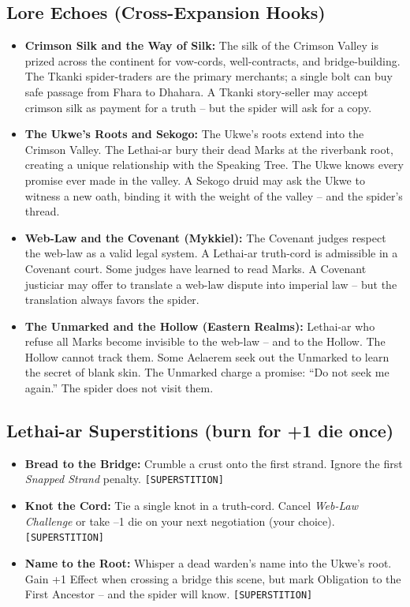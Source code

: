 \subsection*{Lore Echoes (Cross-Expansion Hooks)}
\label{sec:lethaiar-lore}

\begin{itemize}
  \item \textbf{Crimson Silk and the Way of Silk:} The silk of the Crimson Valley is prized across the continent for vow-cords, well-contracts, and bridge-building. The Tkanki spider-traders are the primary merchants; a single bolt can buy safe passage from Fhara to Dhahara. A Tkanki story-seller may accept crimson silk as payment for a truth -- but the spider will ask for a copy.
  \item \textbf{The Ukwe's Roots and Sekogo:} The Ukwe's roots extend into the Crimson Valley. The Lethai-ar bury their dead Marks at the riverbank root, creating a unique relationship with the Speaking Tree. The Ukwe knows every promise ever made in the valley. A Sekogo druid may ask the Ukwe to witness a new oath, binding it with the weight of the valley -- and the spider's thread.
  \item \textbf{Web-Law and the Covenant (Mykkiel):} The Covenant judges respect the web-law as a valid legal system. A Lethai-ar truth-cord is admissible in a Covenant court. Some judges have learned to read Marks. A Covenant justiciar may offer to translate a web-law dispute into imperial law -- but the translation always favors the spider.
  \item \textbf{The Unmarked and the Hollow (Eastern Realms):} Lethai-ar who refuse all Marks become invisible to the web-law -- and to the Hollow. The Hollow cannot track them. Some Aelaerem seek out the Unmarked to learn the secret of blank skin. The Unmarked charge a promise: ``Do not seek me again.'' The spider does not visit them.
\end{itemize}

\subsection*{Lethai-ar Superstitions (burn for +1 die once)}
\begin{itemize}
  \item \textbf{Bread to the Bridge:} Crumble a crust onto the first strand. Ignore the first \emph{Snapped Strand} penalty. \texttt{[SUPERSTITION]}
  \item \textbf{Knot the Cord:} Tie a single knot in a truth-cord. Cancel \emph{Web-Law Challenge} or take --1 die on your next negotiation (your choice). \texttt{[SUPERSTITION]}
  \item \textbf{Name to the Root:} Whisper a dead warden's name into the Ukwe's root. Gain +1 Effect when crossing a bridge this scene, but mark Obligation to the First Ancestor -- and the spider will know. \texttt{[SUPERSTITION]}
\end{itemize}

